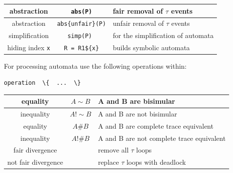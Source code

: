 \documentclass[]{article}
\newcounter{dead1}
\newcounter{dead2}
\begin{document}
\vspace{2ex}
\begin{tabular}{|c|c|l|} 
\hline abstraction  & {\tt abs(P)} & fair removal of $\tau$ events \\ 
\hline abstraction  & {\tt abs\{unfair\}(P)} & unfair  removal of $\tau$ events \\ \hline
simplification  & {\tt simp(P) } & for the simplification of automata \\ \hline
hiding index \verb|x| &\verb|R = R1${x}|&  builds symbolic automata \\ \hline
\end{tabular}

\vspace{2ex} \noindent For processing automata use the following operations within:

\begin{verbatim}operation  \{  ...  \}\end{verbatim}

\vspace{2ex}
\begin{tabular}{|c|c|l|}\hline
equality   & $A\sim B$  & A and B are bisimular\\ \hline
inequality   & $A!\sim B$  & A and B are not bisimular\\ \hline
equality   & $A\# B$  & A and B are complete trace equivalent\\ \hline
inequality   & $A!\# B$  & A and B are not complete trace equivalent\\ \hline
fair divergence  & & remove all $\tau$ loops \\ \hline
not fair divergence  & & replace $\tau$ loops  with deadlock\\ \hline
\end{tabular}







\end{document}
